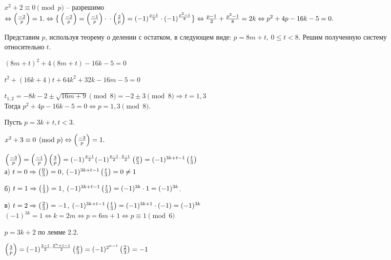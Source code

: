 \documentclass[a4paper,11pt,openany]{book}
\begin{document}

$x^2 + 2 \equiv 0 \pmod p $ -- разрешимо $ \Leftrightarrow \left( \frac{-2}{p} \right) = 1. \Leftrightarrow \big \{ \left( \frac{-2}{p} \right) = \left( \frac{-1}{p} \right) \cdot \\ \cdot \left( \frac{2}{p} \right) = (-1)^{\frac{p-1}{2}} \cdot (-1)^{\frac{p^2-1}{8}} \big \} \Leftrightarrow \frac{p-1}{2} + \frac{p^2-1}{8} = 2k \Leftrightarrow p^2 + 4p - 16k - 5 = 0.$

Представим $p$, используя теорему о делении с остатком, в следующем виде: $p = 8m + t,\ 0 \le t < 8$. Решим полученную систему относительно $t$.

$(8m + t)^2 + 4(8m + t) - 16k -5 = 0$

$ t^2 + (16k + 4)t + 64k^2 + 32k - 16m - 5 = 0$

$t_{1, 2} = -8k - 2 \pm \sqrt{16m + 9} \pmod 8 = -2 \pm 3 \pmod 8 \Rightarrow t = 1,3$ \\

\noindent Тогда $p^2 + 4p - 16k - 5 = 0 \Leftrightarrow p = 1, 3 \pmod 8$.


Пусть $p = 3k + t, t < 3.$

$x^2 + 3 \equiv 0 \pmod p \Leftrightarrow \left( \frac{-3}{p} \right) = 1.$

$ \left( \frac{-3}{p} \right) = \left( \frac{-1}{p} \right) \left( \frac{3}{p} \right) = (-1)^{\frac{p-1}{2}}(-1)^{\frac{p-1}{2} \cdot \frac{3-1}{2}} \left( \frac{p}{3} \right) = (-1)^{3k + t -1} \left( \frac{t}{3} \right)$\\

а) $t = 0 \Rightarrow \left( \frac{0}{3} \right) = 0$, $(-1)^{3k + t -1} \left( \frac{t}{3} \right) = 0 \ne 1$

б) $t = 1 \Rightarrow \left( \frac{1}{3} \right) = 1$, $(-1)^{3k + t -1} \left( \frac{t}{3} \right) = (-1)^{3k} \cdot 1 = (-1)^{3k}$.

в) $t = 2 \Rightarrow \left( \frac{2}{3} \right) = -1$, $(-1)^{3k + t -1} \left( \frac{t}{3} \right) = (-1)^{3k + 1} \cdot (-1) = (-1)^{3k}$ \\

$(-1)^{3k} = 1 \Leftrightarrow k = 2m \Leftrightarrow p = 6m + 1 \Leftrightarrow p \equiv 1 \pmod 6$


$p = 3k + 2$ по лемме 2.2. 

$ \left( \frac{3}{p} \right) = (-1)^{\frac{3-1}{2} \cdot \frac{2^n + 1 -1}{2}} \left( \frac{p}{3} \right) = (-1)^{2^{n - 1}} \left( \frac{2}{3} \right) = -1$ \\
\end{document}
